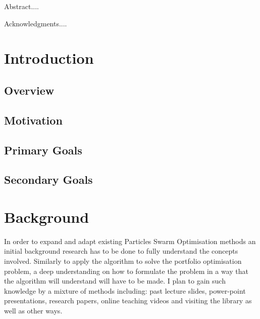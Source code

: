 \documentclass{pdfmx4020}
\begin{document}
\newfrontpage


\begin{Abstract}
Abstract....
\end{Abstract}

\begin{Acknowledgments}
Acknowledgments....
\end{Acknowledgments}

\StartThesis

\listoffigures
\listoftables

\chapter{Introduction}
  \section{Overview} %
  \label{sec:overview}
  

  \section{Motivation} %
  \label{sec:motivation}

  \section{Primary Goals} %
  \label{sec:primary_goals}
  

  \section{Secondary Goals} %
  \label{sec:secondary_goals}
  

\chapter{Background}\label{chap:background}
  In order to expand and adapt existing Particles Swarm Optimisation methods an initial background research has to be done to fully understand the concepts involved. Similarly to apply the algorithm to solve the portfolio optimisation problem, a deep understanding on how to formulate the problem in a way that the algorithm will understand will have to be made. I plan to gain such knowledge by a mixture of methods including: past lecture slides, power-point presentations, research papers, online teaching videos and visiting the library as well as other ways.
\end{document}
